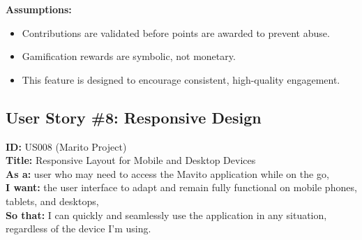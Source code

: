 \documentclass[12pt]{article}
\begin{document}
\vspace{1em}
\textbf{Assumptions:}
\begin{itemize}
    \item Contributions are validated before points are awarded to prevent abuse.
    \item Gamification rewards are symbolic, not monetary.
    \item This feature is designed to encourage consistent, high-quality engagement.
\end{itemize}


\subsection{User Story \#8: Responsive Design}
\textbf{ID:} US008 (Marito Project) \\
\textbf{Title:} Responsive Layout for Mobile and Desktop Devices \\
\textbf{As a:} user who may need to access the Mavito application while on the go, \\
\textbf{I want:} the user interface to adapt and remain fully functional on mobile phones, tablets, and desktops, \\
\textbf{So that:} I can quickly and seamlessly use the application in any situation, regardless of the device I'm using.
\end{document}
